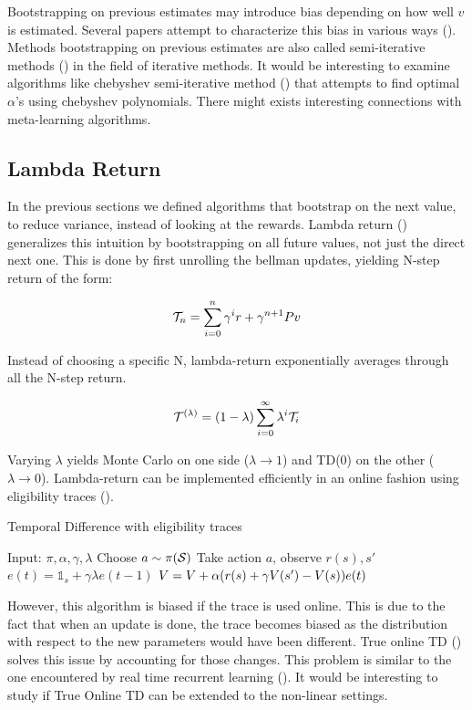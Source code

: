 Bootstrapping on previous estimates may introduce bias depending on how well $v$ is estimated. Several papers attempt to characterize this bias in various ways (\cite{kearns2000bias,sutton1994step}). Methods bootstrapping on previous estimates are also called semi-iterative methods (\cite{varga2009matrix}) in the field of iterative methods. It would be interesting to examine algorithms like chebyshev semi-iterative method (\cite{golub1961chebyshev}) that attempts to find optimal $\alpha$'s using chebyshev polynomials. There might exists interesting connections with meta-learning algorithms.
\subsection{Lambda Return}
In the previous sections we defined algorithms that bootstrap on the next value, to reduce variance, instead of looking at the rewards. Lambda return (\cite{sutton1984temporal}) generalizes this intuition by bootstrapping on all future values, not just the direct next one. This is done by first unrolling the bellman updates, yielding N-step return of the form:
\begin{definition}
\begin{equation}
    \mathcal{T}_{n} = \sum_{i=0}^{n} \gamma^i r + \gamma^{n+1} Pv
\end{equation}
\end{definition}
Instead of choosing a specific N, lambda-return exponentially averages through all the N-step return.
\begin{definition}
\begin{equation}
    \mathcal{T}^{(\lambda)} = (1-\lambda) \sum_{i=0}^{\infty} \lambda^i \mathcal{T}_{i}
\end{equation}
\end{definition}

Varying $\lambda$ yields Monte Carlo on one side ($\lambda \rightarrow 1$) and TD(0) on the other ($\lambda \rightarrow 0$).
Lambda-return can be implemented efficiently in an online fashion using eligibility traces (\cite{sutton1984temporal,singh1996reinforcement,precup2000eligibility}).\\
\begin{algorithm}[H]
\caption{Temporal Difference with eligibility traces}
\begin{algorithmic}[1]
    \STATE Input: $\pi,\alpha,\gamma,\lambda$
        \STATE Choose $a \sim \pi(\mathcal{S})$
        \STATE Take action $a$, observe $r(s),s'$
        \STATE $e(t) =  \mathbb{1}_{s}+ \gamma \lambda e(t-1)$
        \STATE $V = V + \alpha (r(s) + \gamma V(s')-V(s)) e(t)$
    \ENDFOR
\end{algorithmic}
\label{alg:eligibility_traces}
\end{algorithm}
However, this algorithm is biased if the trace is used online. This is due to the fact that when an update is done, the trace becomes biased as the distribution with respect to the new parameters would have been different. True online TD (\cite{seijen2014true}) solves this issue by accounting for those changes. This problem is similar to the one encountered by real time recurrent learning (\cite{williams1995gradient}). It would be interesting to study if True Online TD can be extended to the non-linear settings. 
